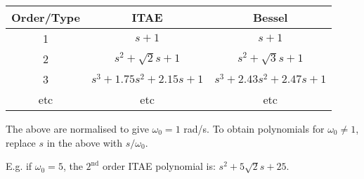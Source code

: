 \begin{tabular}{|c|c|c|}
\hline
\textbf{Order/Type} & \textbf{ITAE} & \textbf{Bessel}\\
\hline
1 & $s+1$ & $s+1$\\
\hline
2 & $s^2+\sqrt{2}s+1$ & $s^2+\sqrt{3}s+1$\\
\hline
3 & $s^3+1.75s^2+2.15s+1$ & $s^3+2.43s^2+2.47s+1$\\
\hline
etc & etc & etc\\
\hline
\end{tabular}

The above are normalised to give $\omega_0=1$ rad/s. To obtain polynomials for $\omega_0\ne 1$, replace $s$ in the above with $s/\omega_0$.

E.g. if $\omega_0=5$, the $2^\mathrm{nd}$ order ITAE polynomial is: $s^2+5\sqrt{2}s+25$.

\endinput

